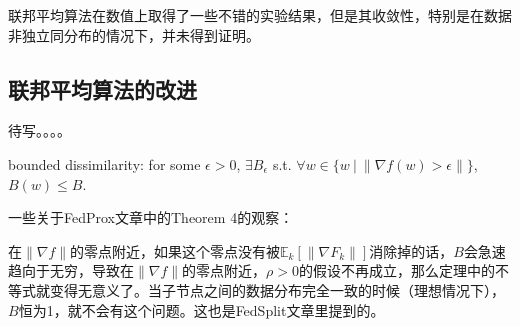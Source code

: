 联邦平均算法在数值上取得了一些不错的实验结果\cite{mcmahan2017fed_avg}，但是其收敛性，特别是在数据非独立同分布的情况下，并未得到证明。

\subsection{联邦平均算法的改进}
\label{subsec:chap2-overview-fedavg-improve}

待写。。。。




bounded dissimilarity:
for some $\epsilon > 0$, $\exists B_{\epsilon}$ s.t. $\forall w \in \{ w ~|~ \lVert \nabla f(w) > \epsilon \rVert \}$, $B(w) \leqslant B$.

一些关于FedProx文章中的Theorem 4的观察：

在$\lVert \nabla f \rVert$的零点附近，如果这个零点没有被$\mathbb{E}_k[\lVert \nabla F_k \rVert]$消除掉的话，$B$会急速趋向于无穷，导致在$\lVert \nabla f \rVert$的零点附近，$\rho > 0$的假设不再成立，那么定理中的不等式就变得无意义了。当子节点之间的数据分布完全一致的时候（理想情况下），$B$恒为1，就不会有这个问题。这也是FedSplit\cite{pathak2020fedsplit}文章里提到的。

